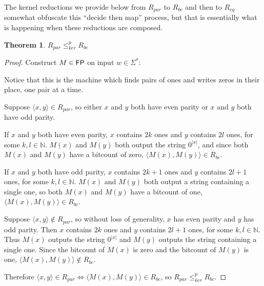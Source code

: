 \documentclass{article}
\newtheorem{theorem}{Theorem}[section]
\theoremstyle{definition} \newtheorem{definition}[definition]{Definition}
\newcommand{\sigmastar}{\Sigma^{*}} %
\newcommand{\kr}{\leq^{p}_{ker}} %
\newcommand{\pair}[2]{\langle#1,#2\rangle} %
\begin{document}
The kernel reductions we provide below from $R_{par}$ to $R_{bc}$ and then to
$R_{eq}$ somewhat obfuscate this ``decide then map'' process, but that is
essentially what is happening when these reductions are composed.

\begin{theorem}$R_{par}\kr R_{bc}$\end{theorem}
\begin{proof}
  Construct $M\in {\ensuremath{\mathsf{FP}}}$ on input $w\in\sigmastar$:\\
  \begin{algorithm}[H]
  \end{algorithm}
  Notice that this is the machine which finds pairs of ones and writes zeros in
  their place, one pair at a time.

  Suppose $\pair{x}{y}\in R_{par}$, so either $x$ and $y$ both have even parity
  or $x$ and $y$ both have odd parity.
  
  If $x$ and $y$ both have even parity, $x$ contains $2k$ ones and $y$ contains
  $2l$ ones, for some $k,l\in\mathbb{N}$. $M(x)$ and $M(y)$ both output the
  string $0^{|x|}$, and since both $M(x)$ and $M(y)$ have a bitcount of zero,
  $\pair{M(x)}{M(y)}\in R_{bc}$.

  If $x$ and $y$ both have odd parity, $x$ contains $2k+1$ ones and $y$
  contains $2l+1$ ones, for some $k,l\in\mathbb{N}$. $M(x)$ and $M(y)$ both
  output a string containing a single one, so both $M(x)$ and $M(y)$ have a
  bitcount of one, $\pair{M(x)}{M(y)}\in R_{bc}$.

  Suppose $\pair{x}{y}\notin R_{par}$, so without loss of generality, $x$ has
  even parity and $y$ has odd parity. Then $x$ contains $2k$ ones and $y$
  contains $2l+1$ ones, for some $k,l\in\mathbb{N}$. Thus $M(x)$ outputs the
  string $0^{|x|}$ and $M(y)$ outputs the string containing a single one. Since
  the bitcount of $M(x)$ is zero and the bitcount of $M(y)$ is one,
  $\pair{M(x)}{M(y)}\notin R_{bc}$.

  Therefore $\pair{x}{y}\in R_{par} \iff \pair{M(x)}{M(y)}\in R_{bc}$, so
  $R_{par} \kr R_{bc}$.
\end{proof}
\end{document}

